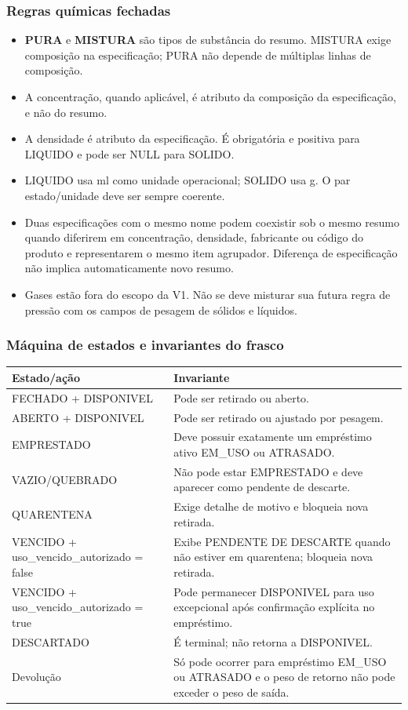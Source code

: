\documentclass[12pt,a4paper]{article}
\begin{document}
\subsubsection{Regras químicas fechadas}
\begin{itemize}
    \item \textbf{PURA} e \textbf{MISTURA} são tipos de substância do resumo. MISTURA exige composição na especificação; PURA não depende de múltiplas linhas de composição.
    \item A concentração, quando aplicável, é atributo da composição da especificação, e não do resumo.
    \item A densidade é atributo da especificação. É obrigatória e positiva para LIQUIDO e pode ser NULL para SOLIDO.
    \item LIQUIDO usa ml como unidade operacional; SOLIDO usa g. O par estado/unidade deve ser sempre coerente.
    \item Duas especificações com o mesmo nome podem coexistir sob o mesmo resumo quando diferirem em concentração, densidade, fabricante ou código do produto e representarem o mesmo item agrupador. Diferença de especificação não implica automaticamente novo resumo.
    \item Gases estão fora do escopo da V1. Não se deve misturar sua futura regra de pressão com os campos de pesagem de sólidos e líquidos.
\end{itemize}

\subsubsection{Máquina de estados e invariantes do frasco}
\begin{center}
\small
\begin{tabularx}{0.96\textwidth}{>{\raggedright\arraybackslash}p{} >{\raggedright\arraybackslash}X}
\toprule
\textbf{Estado/ação} & \textbf{Invariante}\\
\midrule
FECHADO + DISPONIVEL & Pode ser retirado ou aberto.\\
ABERTO + DISPONIVEL & Pode ser retirado ou ajustado por pesagem.\\
EMPRESTADO & Deve possuir exatamente um empréstimo ativo EM\_USO ou ATRASADO.\\
VAZIO/QUEBRADO & Não pode estar EMPRESTADO e deve aparecer como pendente de descarte.\\
QUARENTENA & Exige detalhe de motivo e bloqueia nova retirada.\\
VENCIDO + uso\_vencido\_autorizado = false & Exibe PENDENTE DE DESCARTE quando não estiver em quarentena; bloqueia nova retirada.\\
VENCIDO + uso\_vencido\_autorizado = true & Pode permanecer DISPONIVEL para uso excepcional após confirmação explícita no empréstimo.\\
DESCARTADO & É terminal; não retorna a DISPONIVEL.\\
Devolução & Só pode ocorrer para empréstimo EM\_USO ou ATRASADO e o peso de retorno não pode exceder o peso de saída.\\
\bottomrule
\end{tabularx}
\end{center}
\end{document}
